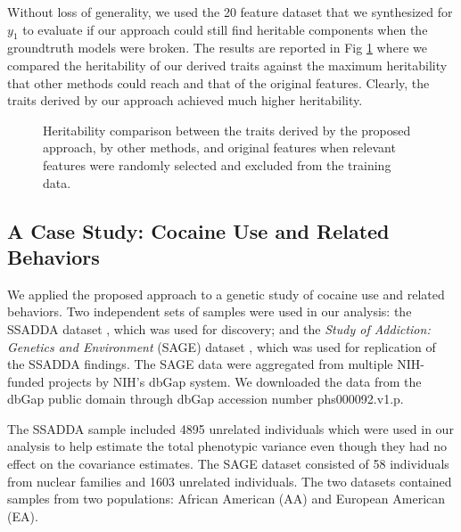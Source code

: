 \documentclass[10pt,letterpaper]{article}
\begin{document}
Without loss of generality, we used the 20 feature dataset that we synthesized for $y_1$ to evaluate if our approach could still find heritable components when the groundtruth models were broken. The results are reported in Fig \ref{fig:simu_incomp} where we compared the heritability of our derived traits against the maximum heritability that other methods could reach and that of the original features. Clearly, the traits derived by our approach achieved much higher heritability. 
\begin{figure}[h!]
	\begin{center}
		\caption{Heritability comparison between the traits derived by the proposed approach, by other methods, and original features when relevant features were randomly selected and excluded from the training data.}
		\label{fig:simu_incomp}
	\end{center}
\end{figure}
 

\subsection*{A Case Study: Cocaine Use and Related Behaviors}
We applied the proposed approach to a genetic study of cocaine use and related behaviors. Two independent sets of samples were used in our analysis: the SSADDA dataset \cite{Gelernter:CD:2014}, which was used for discovery; and the {\em Study of Addiction: Genetics and Environment} (SAGE) dataset \cite{sage:publicdata:2009}, which was used for replication of the SSADDA findings. The SAGE data were aggregated from multiple NIH-funded projects \cite{Bierut:2008:drug_use} by NIH's dbGap system. We downloaded the data from the dbGap public domain \cite{sage:publicdata:2009} through dbGap accession number phs000092.v1.p.

The SSADDA sample included 4895 unrelated individuals which were used in our analysis to help estimate the total phenotypic variance even though they had no effect on the covariance estimates.  The SAGE dataset consisted of 58 individuals from nuclear families and 1603 unrelated individuals. The two datasets contained samples from two populations: African American (AA) and European American (EA). 
\end{document}
